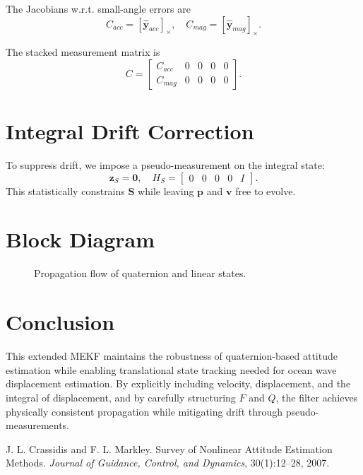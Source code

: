\documentclass[11pt]{article}
\begin{document}
The Jacobians w.r.t. small-angle errors are
\[
C_{acc} = [\hat{\bm{y}}_{acc}]_\times, \quad
C_{mag} = [\hat{\bm{y}}_{mag}]_\times.
\]

The stacked measurement matrix is
\[
C = \begin{bmatrix}
C_{acc} & 0 & 0 & 0 & 0 \\
C_{mag} & 0 & 0 & 0 & 0
\end{bmatrix}.
\]

\section{Integral Drift Correction}
To suppress drift, we impose a pseudo-measurement on the integral state:
\[
\bm{z}_S = \bm{0}, \quad
H_S = \begin{bmatrix} 0 & 0 & 0 & 0 & I \end{bmatrix}.
\]
This statistically constrains $\bm{S}$ while leaving $\bm{p}$ and $\bm{v}$ free to evolve.

\section{Block Diagram}
\begin{figure}[h]
\centering
{}
\caption{Propagation flow of quaternion and linear states.}
\end{figure}

\section{Conclusion}
This extended MEKF maintains the robustness of quaternion-based attitude estimation while enabling translational state tracking needed for ocean wave displacement estimation. By explicitly including velocity, displacement, and the integral of displacement, and by carefully structuring $F$ and $Q$, the filter achieves physically consistent propagation while mitigating drift through pseudo-measurements.


\begin{thebibliography}{9}
J. L. Crassidis and F. L. Markley. 
\newblock Survey of Nonlinear Attitude Estimation Methods.
\newblock \emph{Journal of Guidance, Control, and Dynamics}, 30(1):12--28, 2007.
\end{thebibliography}
\end{document}
